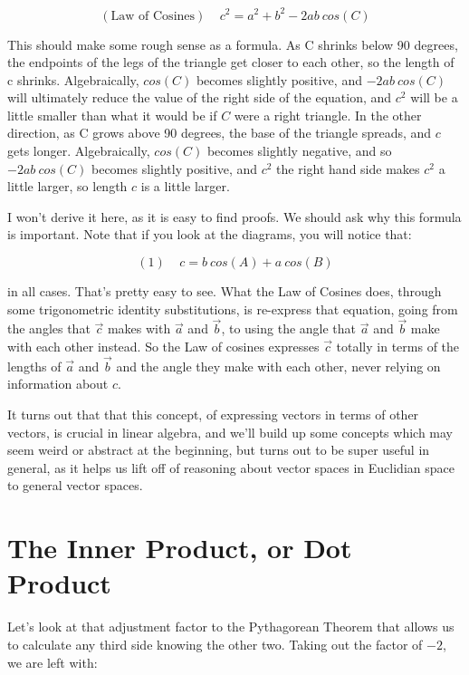 \documentclass[
]{book}
\begin{document}
\[(\text{Law of Cosines}) \ \ \ \ \ c^2 = a^2 + b^2 - 2 a b \ cos(C)\]

This should make some rough sense as a formula. As C shrinks below 90 degrees, the endpoints of the legs of the triangle get closer to each other, so the length of c shrinks. Algebraically, \(cos(C)\) becomes slightly positive, and \(-2 a b \ cos(C)\) will ultimately reduce the value of the right side of the equation, and \(c^2\) will be a little smaller than what it would be if \(C\) were a right triangle. In the other direction, as C grows above 90 degrees, the base of the triangle spreads, and \(c\) gets longer. Algebraically, \(cos(C)\) becomes slightly negative, and so \(-2 a b \ cos(C)\) becomes slightly positive, and \(c^2\) the right hand side makes \(c^2\) a little larger, so length \(c\) is a little larger.

I won't derive it here, as it is easy to find proofs. We should ask why this formula is important. Note that if you look at the diagrams, you will notice that:

\[(1) \ \ \ \ \ c = b \ cos(A) + a \ cos(B)\]

in all cases. That's pretty easy to see. What the Law of Cosines does, through some trigonometric identity substitutions, is re-express that equation, going from the angles that \(\vec{c}\) makes with \(\vec{a}\) and \(\vec{b}\), to using the angle that \(\vec{a}\) and \(\vec{b}\) make with each other instead. So the Law of cosines expresses \(\vec{c}\) totally in terms of the lengths of \(\vec{a}\) and \(\vec{b}\) and the angle they make with each other, never relying on information about \(c\).

It turns out that that this concept, of expressing vectors in terms of other vectors, is crucial in linear algebra, and we'll build up some concepts which may seem weird or abstract at the beginning, but turns out to be super useful in general, as it helps us lift off of reasoning about vector spaces in Euclidian space to general vector spaces.

\hypertarget{the-inner-product-or-dot-product}{%
\section{The Inner Product, or Dot Product}\label{the-inner-product-or-dot-product}}

Let's look at that adjustment factor to the Pythagorean Theorem that allows us to calculate any third side knowing the other two. Taking out the factor of \(-2\), we are left with:
\end{document}
